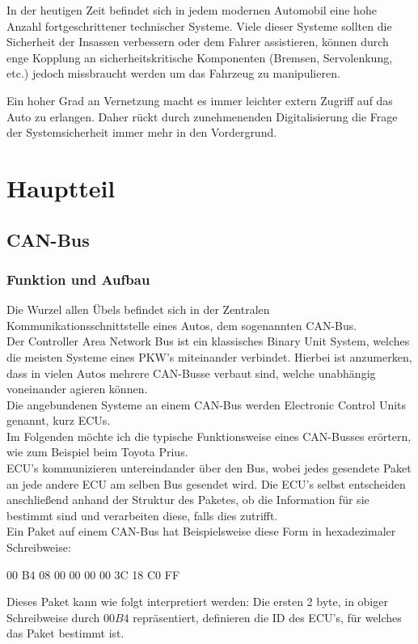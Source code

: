 \documentclass[
    fontsize=12pt,
    headings=small,
    parskip=half,           %
    bibliography=totoc,9
    numbers=noenddot,       %
    open=any,               %
    ]{scrreprt}
\begin{document}
In der heutigen Zeit befindet sich in jedem modernen Automobil eine hohe Anzahl fortgeschrittener technischer Systeme. Viele dieser Systeme sollten die Sicherheit der Insassen verbessern oder dem Fahrer assistieren, können durch enge Kopplung an sicherheitskritische Komponenten (Bremsen, Servolenkung, etc.) jedoch missbraucht werden um das Fahrzeug zu manipulieren.

Ein hoher Grad an Vernetzung macht es immer leichter extern Zugriff auf das Auto zu erlangen. Daher rückt durch zunehmenenden Digitalisierung die Frage der Systemsicherheit immer mehr in den Vordergrund.

\chapter{Hauptteil}
\section{CAN-Bus}
\subsection{Funktion und Aufbau}
Die Wurzel allen Übels befindet sich in der Zentralen Kommunikationsschnittstelle eines Autos, dem sogenannten CAN-Bus.\\
Der Controller Area Network Bus ist ein klassisches Binary Unit System, welches die meisten Systeme eines PKW's miteinander verbindet. Hierbei ist anzumerken, dass in vielen Autos mehrere CAN-Busse verbaut sind, welche unabhängig voneinander agieren können.\\
Die angebundenen Systeme an einem CAN-Bus werden Electronic Control Units genannt, kurz ECUs.\\
Im Folgenden möchte ich die typische Funktionsweise eines CAN-Busses erörtern, wie zum Beispiel beim Toyota Prius.\\
ECU's kommunizieren untereindander über den Bus, wobei jedes gesendete Paket an jede andere ECU am selben Bus gesendet wird.
Die ECU's selbst entscheiden anschließend anhand der Struktur des Paketes, ob die Information für sie bestimmt sind und verarbeiten diese, falls dies zutrifft.\\
Ein Paket auf einem CAN-Bus hat Beispielsweise diese Form in hexadezimaler Schreibweise:

\centerline{00 B4 08 00 00 00 00 3C 18 C0 FF}

Dieses Paket kann wie folgt interpretiert werden:
Die ersten 2 byte, in obiger Schreibweise durch $00 B4$ repräsentiert, definieren die ID des ECU's, für welches das Paket bestimmt ist.
\end{document}
